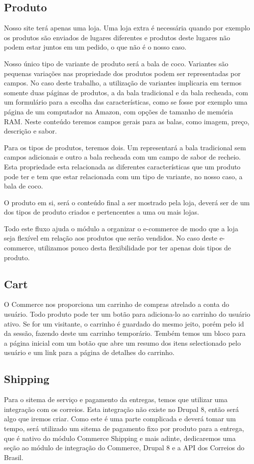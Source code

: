 \documentclass[
	12pt,				%
    oneside,			%
	a4paper,			%
	english,			%
	french,				%
	spanish,			%
	brazil				%
	]{abntex2}
\begin{document}
\subsection{Produto}
Nosso site terá apenas uma loja. Uma loja extra é necessária quando por exemplo os produtos são enviados de lugares diferentes e produtos deste lugares não podem estar juntos em um pedido, o que não é o nosso caso.

Nosso único tipo de variante de produto será a bala de coco. Variantes são pequenas variações nas propriedade dos produtos podem ser representadas por campos. No caso deste trabalho, a utilização de variantes implicaria em termos somente duas páginas de produtos, a da bala tradicional e da bala recheada, com um formulário para a escolha das características, como se fosse por exemplo uma página de um computador na Amazon, com opções de tamanho de memória RAM. Neste conteúdo teremos campos gerais para as balas, como imagem, preço, descrição e sabor.

Para os tipos de produtos, teremos dois. Um representará a bala tradicional sem campos adicionais e outro a bala recheada com um campo de sabor de recheio. Esta propriedade esta relacionada as diferentes características que um produto pode ter e tem que estar relacionada com um tipo de variante, no nosso caso, a bala de coco.

O produto em si, será o conteúdo final a ser mostrado pela loja, deverá ser de um dos tipos de produto criados e pertencentes a uma ou mais lojas.

Todo este fluxo ajuda o módulo a organizar o e-commerce de modo que a loja seja flexível em relação aos produtos que serão vendidos. No caso deste e-commerce, utilizamos pouco desta flexibilidade por ter apenas dois tipos de produto.

\subsection{Cart}
O Commerce nos proporciona um carrinho de compras atrelado a conta do usuário. Todo produto pode ter um botão para adiciona-lo ao carrinho do usuário ativo. Se for um visitante, o carrinho é guardado do mesmo jeito, porém pelo id da sessão, fazendo deste um carrinho temporário. Tembém temos um bloco para a página inicial com um botão que abre um resumo dos itens selectionado pelo usuário e um link para a página de detalhes do carrinho.

\subsection{Shipping}
Para o sitema de serviço e pagamento da entregas, temos que utilizar uma integração com os correios. Esta integração não existe no Drupal 8, então será algo que iremos criar. Como este é uma parte complicada e deverá tomar um tempo, será utilizado um sitema de pagamento fixo por produto para a entrega, que é nativo do módulo Commerce Shipping e mais adinte, dedicaremos uma seção ao módulo de integração do Commerce, Drupal 8 e a API dos Correios do Brasil.
\end{document}
